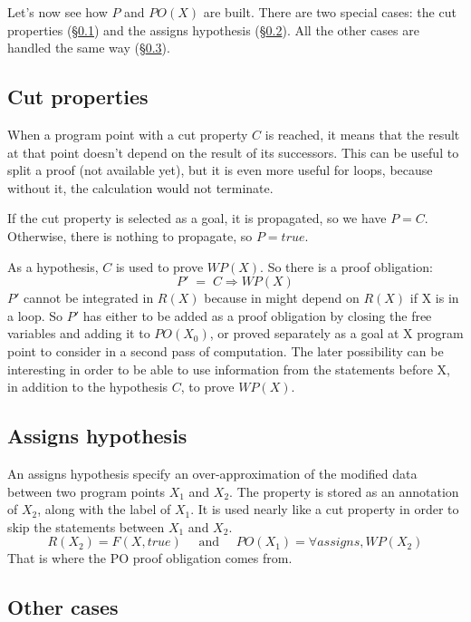 Let's now see how \(P\) and \(PO(X)\) are built.
There are two special cases: the cut properties (\S\ref{def-wp-cut})
and the assigns hypothesis (\S\ref{def-wp-assign-hyp}). 
All the other cases are handled the same way (\S\ref{def-wp-def}).

\subsection{Cut properties}\label{def-wp-cut}

When a program point with a cut property $C$ is reached, 
it means that the result at that point doesn't depend on the result of its
successors. This can be useful to split a proof (not available yet), 
but it is even more useful for loops,
because without it, the calculation would not terminate.

If the cut property is selected as a goal, it is propagated, so we have 
\(P = C\). Otherwise, there is nothing to propagate, so \(P = true\).

As a hypothesis, $C$ is used to prove \(WP(X)\). 
So there is a proof obligation:
\[ P' \; = \; C \Rightarrow WP(X) \]
$P'$ cannot be integrated in \(R(X)\) because in might depend on
\(R(X)\) if X is in a loop.
So $P'$ has either to be added as a proof obligation
by closing the free variables and adding it to \(PO(X_0)\),
or proved separately as a goal at X program point to consider
in a second pass of computation.
The later possibility can be interesting in order to be able to use
information from the statements before X, in addition to the hypothesis \(C\),
to prove \(WP(X)\). 


\subsection{Assigns hypothesis}\label{def-wp-assign-hyp}

An assigns hypothesis specify an over-approximation of the modified data
between two program points \(X_1\) and \(X_2\). The property is stored as
an annotation of \(X_2\), along with the label of \(X_1\).
It is used nearly like a cut property in order to skip the statements
between \(X_1\) and \(X_2\).
\[
R(X_2) = F (X, true) 
\quad\textrm{ and }\quad 
PO(X_1) = \forall {assigns}, WP(X_2)
\]
That is where the PO proof obligation comes from.

\subsection{Other cases}\label{def-wp-def}


